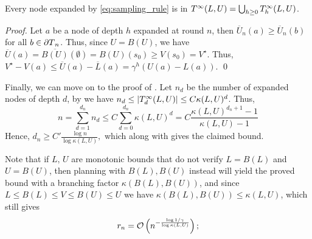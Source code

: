 \documentclass[runningheads]{llncs}
\begin{document}
\begin{lemma}
\label{lem:near-optimal-nodes-U}
Every node expanded by \eqref{eq:sampling_rule} is in $T^\infty(L,U) = \bigcup_{h\geq 0} T^\infty_h(L,U)$.
\end{lemma}
\begin{proof}
Let $a$ be a node of depth $h$ expanded at round $n$, then $\overline{U}_n(a) \geq \overline{U}_n(b)$ for all $b\in{\partial T}_n$. Thus, since $U = B(U)$, we have $\overline{U}(a) = \overline{B(U)}(\emptyset) = B(U)(s_0) \geq V(s_0) = V^\star$. Thus, $V^\star - V(a) \leq \overline{U}(a) - \overline{L}(a) = \gamma^h(U(a) - L(a))$.
\qed\end{proof}

Finally, we can move on to the proof of .
Let $n_d$ be the number of expanded nodes of depth $d$, by  we have $n_d \leq |T^\infty_d(L,U)| \leq C\kappa(L,U)^d$. Thus, 
\[n = \sum_{d=1}^{d_n} n_d \leq C\sum_{d=0}^{d_n} \kappa(L,U)^d = C\frac{\kappa(L,U)^{d_n+1}-1}{\kappa(L,U)-1}\]
Hence, $d_n \geq C'\frac{\log n}{\log\kappa(L,U)},$ which along with  gives the claimed bound.

Note that if $L,\,U$ are monotonic bounds that do not verify $L = B(L)$ and $U=B(U)$, then planning with $B(L),B(U)$ instead will yield the proved bound with a branching factor $\kappa(B(L),B(U))$, and since $L\leq B(L)\leq V\leq B(U)\leq U$ we have $\kappa(B(L),B(U)) \leq \kappa(L,U)$, which still gives \begin{align*}
r_n = \mathcal{O}\left(n^{-\frac{\log 1/\gamma}{\log \kappa(L,U)}}\right);
\end{align*}


\end{document}
